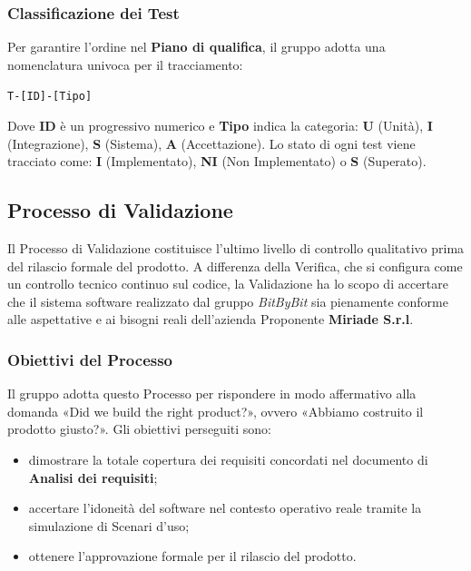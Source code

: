 \documentclass[a4paper,12pt]{article}
\begin{document}
\subsubsection{Classificazione dei Test}
Per garantire l'ordine nel \textbf{Piano di qualifica}, il gruppo adotta una nomenclatura univoca per il tracciamento:
\begin{center}
    \texttt{T-[ID]-[Tipo]}
\end{center}
Dove \textbf{ID} è un progressivo numerico e \textbf{Tipo} indica la categoria: \textbf{U} (Unità), \textbf{I} (Integrazione), \textbf{S} (Sistema), \textbf{A} (Accettazione).
Lo stato di ogni test viene tracciato come: \textbf{I} (Implementato), \textbf{NI} (Non Implementato) o \textbf{S} (Superato).

\subsection{Processo di Validazione}
Il Processo di Validazione costituisce l'ultimo livello di controllo qualitativo prima del rilascio formale del prodotto.
A differenza della Verifica, che si configura come un controllo tecnico continuo sul codice, la Validazione ha lo scopo di accertare che il sistema software realizzato dal gruppo \textit{BitByBit} sia pienamente conforme alle aspettative e ai bisogni reali dell'azienda Proponente \textbf{Miriade S.r.l}.

\subsubsection{Obiettivi del Processo}
Il gruppo adotta questo Processo per rispondere in modo affermativo alla domanda «Did we build the right product?», ovvero «Abbiamo costruito il prodotto giusto?».
Gli obiettivi perseguiti sono:
\begin{itemize}
    \item dimostrare la totale copertura dei requisiti concordati nel documento di \textbf{Analisi dei requisiti};
    \item accertare l'idoneità del software nel contesto operativo reale tramite la simulazione di Scenari d'uso;
    \item ottenere l'approvazione formale per il rilascio del prodotto.
\end{itemize}
\end{document}

